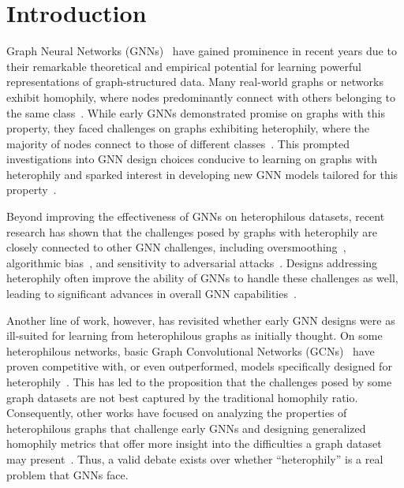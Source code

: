 \section{Introduction}
Graph Neural Networks (GNNs)~\cite{dlgsurvey_tkde20,wu2020comprehensive} have gained prominence in recent years due to their remarkable theoretical and empirical potential for learning powerful representations of graph-structured data. Many real-world graphs or networks exhibit homophily, where nodes predominantly connect with others belonging to the same class~\cite{mcpherson2001birds,zhu2020beyond}. While early GNNs demonstrated promise on graphs with this property, they faced challenges on graphs exhibiting heterophily, where the majority of nodes connect to those of different classes~\cite{MixHop,Pei2020Geom-GCN,zhu2020beyond}. This prompted investigations into GNN design choices conducive to learning on graphs with heterophily and sparked interest in developing new GNN models tailored for this property~\cite{zhu2020beyond,yan2022two,chien2021adaptive,zhang2021beyond,luan2022revisiting,yan2022two,zheng2022graph,song2023ordered}.

Beyond improving the effectiveness of GNNs on heterophilous datasets, recent research has shown that the challenges posed by graphs with heterophily are closely connected to other GNN challenges, including oversmoothing~\cite{li2018deeper,chen2020simple}, algorithmic bias~\cite{li2021dyadic,wang2022improving}, and sensitivity to adversarial attacks~\cite{zugner2018adversarial,dai2018adversarial,xu2019topology,wu2019adversarial,li2020adversarial,ma2020towards}. Designs addressing heterophily often improve the ability of GNNs to handle these challenges as well, leading to significant advances in overall GNN capabilities~\cite{chien2021adaptive,yan2022two,loveland2022graph,zhu2022heterophily,bodnar2022neural}.

Another line of work, however, has revisited whether early GNN designs were as ill-suited for learning from heterophilous graphs as initially thought. On some heterophilous networks, basic Graph Convolutional Networks (GCNs)~\cite{kipf2016semi} have proven competitive with, or even outperformed, models specifically designed for heterophily~\cite{ma2021homophily,luan2022revisiting}. This has led to the proposition that the challenges posed by some graph datasets are not best captured by the traditional homophily ratio. Consequently, other works have focused on analyzing the properties of heterophilous graphs that challenge early GNNs and designing generalized homophily metrics that offer more insight into the difficulties a graph dataset may present~\cite{ma2021homophily,luan2022revisiting}. Thus, a valid debate exists over whether ``heterophily'' is a real problem that GNNs face.

